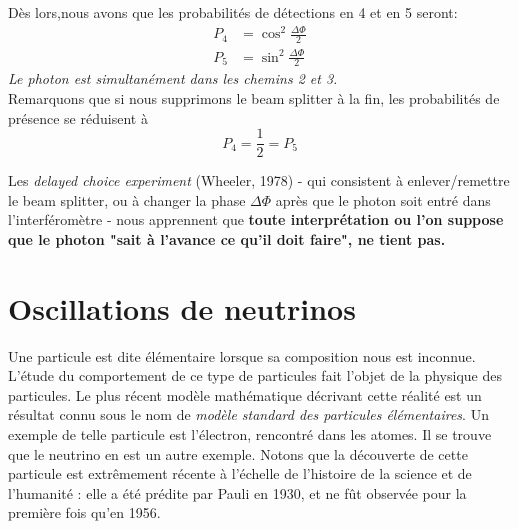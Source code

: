 \documentclass[../notesdecours.tex]{subfiles}
\begin{document}
Dès lors,nous avons que les probabilités de détections en 4 et en 5 seront:
\begin{align}
    P_4 &= \cos^2 \frac{\Delta \Phi}{2}\\
    P_5 &= \sin^2 \frac{\Delta \Phi}{2}
\end{align}
\emph{Le photon est simultanément dans les chemins 2 et 3.}\\

Remarquons que si nous supprimons le beam splitter à la fin, les probabilités de présence se réduisent à
\begin{equation}
    P_4 = \frac{1}{2} = P_5
\end{equation}

Les \emph{delayed choice experiment} (Wheeler, 1978) - qui consistent à enlever/remettre le beam splitter, ou à changer la phase $\Delta\Phi$ après que le photon soit entré dans l'interféromètre - nous apprennent que \textbf{toute interprétation ou l'on suppose que le photon "sait à l'avance ce qu'il doit faire", ne tient pas.}

\section{Oscillations de neutrinos}
Une particule est dite élémentaire lorsque sa composition nous est inconnue. L'étude du comportement de ce type de particules fait l'objet de la physique des particules. Le plus récent modèle mathématique décrivant cette réalité est un résultat connu sous le nom de \textit{modèle standard des particules élémentaires}. Un exemple de telle particule est l'électron, rencontré dans les atomes. Il se trouve que le neutrino en est un autre exemple. Notons que la découverte de cette particule est extrêmement récente à l'échelle de l'histoire de la science et de l'humanité : elle a été prédite par Pauli en 1930, et ne fût observée pour la première fois qu'en 1956.\\
\end{document}

